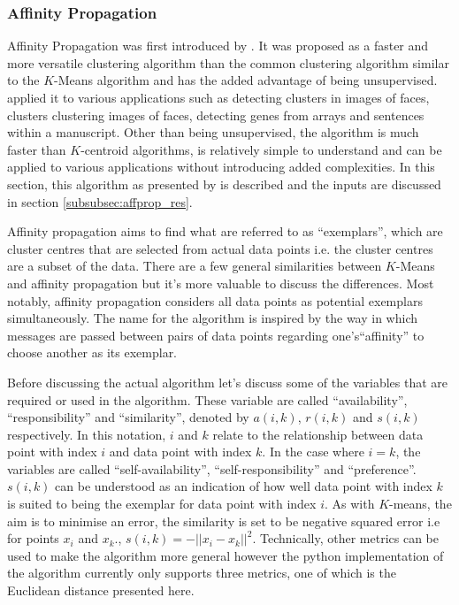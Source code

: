 \documentclass[a4paper]{article}
\begin{document}

\subsubsection{Affinity Propagation}
\label{subsubsec:afprop}
Affinity Propagation was first introduced by \cite{frey07}. It was proposed as a faster and more versatile clustering algorithm than the common clustering algorithm similar to the $K$-Means algorithm and has the added advantage of being unsupervised. \cite{frey07} applied it to various applications such as detecting clusters in images of faces, clusters clustering images of faces, detecting genes from arrays and sentences within a manuscript. Other than being unsupervised, the algorithm is much faster than $K$-centroid algorithms, is relatively simple to understand and can be applied to various applications without introducing added complexities. In this section, this algorithm as presented by \cite{frey07} is described and the inputs are discussed in section \ref{subsubsec:affprop_res}.

Affinity propagation aims to find what are referred to as ``exemplars'', which are cluster centres that are selected from actual data points i.e. the cluster centres are a subset of the data. There are a few general similarities between $K$-Means and affinity propagation but it's more valuable to discuss the differences. Most notably, affinity propagation considers all data points as potential exemplars simultaneously. The name for the algorithm is inspired by the way in which messages are passed between pairs of data points regarding one's``affinity'' to choose another as its exemplar.

Before discussing the actual algorithm let's discuss some of the variables that are required or used in the algorithm. These variable are called ``availability'', ``responsibility'' and ``similarity'', denoted by $a(i,k)$, $r(i,k)$ and $s(i,k)$ respectively. In this notation, $i$ and $k$ relate to the relationship between data point with index $i$ and data point with index $k$. In the case where $i=k$, the variables are called ``self-availability'', ``self-responsibility'' and ``preference''.  $s(i,k)$ can be understood as an indication of how well data point with index $k$ is suited to being the exemplar for data point with index $i$. As with $K$-means, the aim is to minimise an error, the similarity is set to be negative squared error i.e for points $x_i$ and $x_k$., $s(i,k) = -||x_i - x_k||^2$. Technically, other metrics can be used to make the algorithm more general however the python implementation of the algorithm currently only supports three metrics, one of which is the Euclidean distance presented here. 
\end{document}
